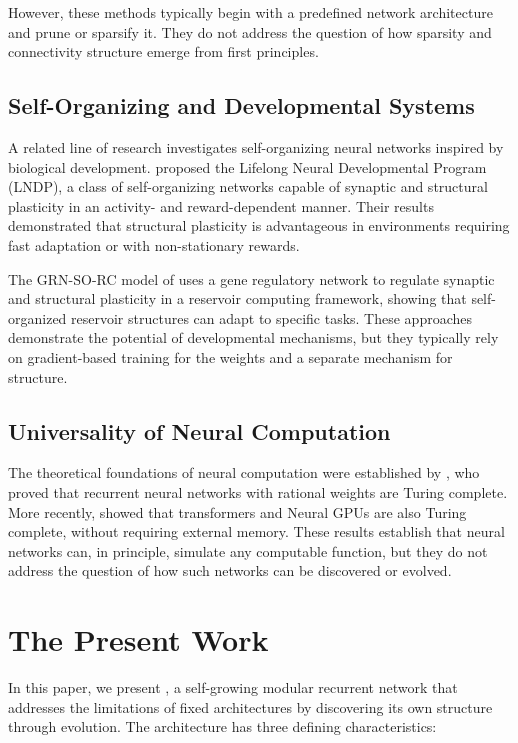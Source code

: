 However, these methods typically begin with a predefined network
architecture and prune or sparsify it. They do not address the question
of how sparsity and connectivity structure emerge from first principles.

\subsection{Self-Organizing and Developmental Systems}

A related line of research investigates self-organizing neural networks
inspired by biological development. \citet{plantec2024evolving} proposed
the Lifelong Neural Developmental Program (LNDP), a class of
self-organizing networks capable of synaptic and structural plasticity
in an activity- and reward-dependent manner. Their results demonstrated
that structural plasticity is advantageous in environments requiring
fast adaptation or with non-stationary rewards.

The GRN-SO-RC model of \citet{hajizada2024developmental} uses a gene
regulatory network to regulate synaptic and structural plasticity in a
reservoir computing framework, showing that self-organized reservoir
structures can adapt to specific tasks. These approaches demonstrate the
potential of developmental mechanisms, but they typically rely on
gradient-based training for the weights and a separate mechanism for
structure.

\subsection{Universality of Neural Computation}

The theoretical foundations of neural computation were established by
\citet{siegelmann1995computational}, who proved that recurrent neural
networks with rational weights are Turing complete. More recently,
\citet{perez2021turing} showed that transformers and Neural GPUs are
also Turing complete, without requiring external memory. These results
establish that neural networks can, in principle, simulate any
computable function, but they do not address the question of how such
networks can be discovered or evolved.

\section{The Present Work}

In this paper, we present \modnet{}, a self-growing modular recurrent
network that addresses the limitations of fixed architectures by
discovering its own structure through evolution. The architecture has
three defining characteristics:

